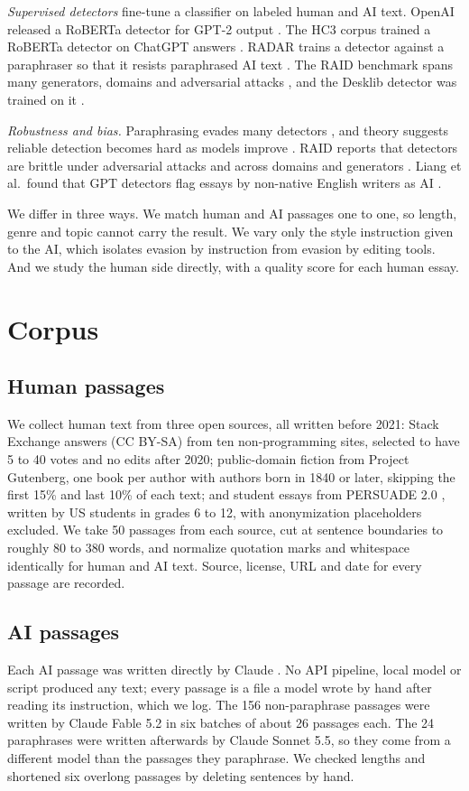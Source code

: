\documentclass[conference]{IEEEtran}
\begin{document}
\textit{Supervised detectors} fine-tune a classifier on labeled human and AI text. OpenAI released a RoBERTa detector for GPT-2 output \cite{solaiman}. The HC3 corpus trained a RoBERTa detector on ChatGPT answers \cite{hc3}. RADAR trains a detector against a paraphraser so that it resists paraphrased AI text \cite{radar}. The RAID benchmark spans many generators, domains and adversarial attacks \cite{raid}, and the Desklib detector was trained on it \cite{desklib}.

\textit{Robustness and bias.} Paraphrasing evades many detectors \cite{krishna}, and theory suggests reliable detection becomes hard as models improve \cite{sadasivan}. RAID reports that detectors are brittle under adversarial attacks and across domains and generators \cite{raid}. Liang et al.\ found that GPT detectors flag essays by non-native English writers as AI \cite{liang}.

We differ in three ways. We match human and AI passages one to one, so length, genre and topic cannot carry the result. We vary only the style instruction given to the AI, which isolates evasion by instruction from evasion by editing tools. And we study the human side directly, with a quality score for each human essay.

\section{Corpus}
\label{sec:corpus}
\subsection{Human passages}
We collect human text from three open sources, all written before 2021: Stack Exchange answers (CC BY-SA) from ten non-programming sites, selected to have 5 to 40 votes and no edits after 2020; public-domain fiction from Project Gutenberg, one book per author with authors born in 1840 or later, skipping the first 15\% and last 10\% of each text; and student essays from PERSUADE 2.0 \cite{persuade}, written by US students in grades 6 to 12, with anonymization placeholders excluded. We take 50 passages from each source, cut at sentence boundaries to roughly 80 to 380 words, and normalize quotation marks and whitespace identically for human and AI text. Source, license, URL and date for every passage are recorded.

\subsection{AI passages}
Each AI passage was written directly by Claude \cite{claude}. No API pipeline, local model or script produced any text; every passage is a file a model wrote by hand after reading its instruction, which we log. The 156 non-paraphrase passages were written by Claude Fable 5.2 in six batches of about 26 passages each. The 24 paraphrases were written afterwards by Claude Sonnet 5.5, so they come from a different model than the passages they paraphrase. We checked lengths and shortened six overlong passages by deleting sentences by hand.
\end{document}

